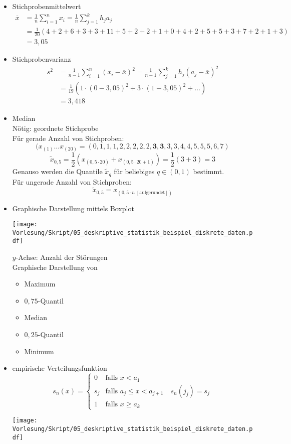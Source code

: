 \documentclass{scrreprt}
\begin{document}
\begin{itemize}
\item Stichprobenmittelwert
\begin{align*}
\overline{x} &= \frac{1}{n} \sum_{i=1}^n x_i = \frac{1}{n} \sum_{j=1}^k h_j a_j\\
&= \frac{1}{20}(4+2+6+3+3+11+5+2+2+1+0+4+2+5+5+3+7+2+1+3)\\
&= 3,05
\end{align*}
\item Stichprobenvarianz
\begin{align*}
s^2 &= \frac{1}{n-1}\sum_{i=1}^n (x_i-\overline{x})^2 = \frac{1}{n-1}\sum_{j=1}^k h_j (a_j-\overline{x})^2\\
&= \frac{1}{19} (1 \cdot (0-3,05)^2 + 3 \cdot (1-3,05)^2 + \ldots)\\
&= 3,418
\end{align*}
\item Median\\
Nötig: geordnete Stichprobe\\
Für gerade Anzahl von Stichproben:
$$(x_{(1)}\ldots x_{(20)}=(0,1,1,1,2,2,2,2,2,\textbf{3},\textbf{3},3,3,4,4,5,5,5,6,7)$$
$$\tilde x _{0,5} = \frac{1}{2}(x_{(0,5\cdot 20)} + x_{(0,5\cdot 20 + 1)}) = \frac{1}{2}(3+3) = 3$$
Genauso werden die Quantile $\tilde x_q$ für beliebiges $q \in (0,1)$ bestimmt.\\
Für ungerade Anzahl von Stichproben: 
$$\tilde x_{0,5}=x_{(0,5 \cdot n\;[\mathrm{aufgerundet}])}$$
\item Graphische Darstellung mittels Boxplot
\begin{center}
\texttt{[image: Vorlesung/Skript/05\_deskriptive\_statistik\_beispiel\_diskrete\_daten.pdf]}
\end{center}
$y$-Achse: Anzahl der Störungen\\
Graphische Darstellung von 
\begin{itemize}
\item Maximum
\item $0,75$-Quantil
\item Median
\item $0,25$-Quantil
\item Minimum
\end{itemize}
\item empirische Verteilungsfunktion
$$s_n(x) = \begin{cases}
0 & \text{falls }x < a_1\\
s_j & \text{falls }a_j \leq x < a_{j+1} \quad s_n(j_j) = s_j\\
1 & \text{falls }x\geq a_k
\end{cases}$$
\begin{center}
\texttt{[image: Vorlesung/Skript/05\_deskriptive\_statistik\_beispiel\_diskrete\_daten.pdf]}
\end{center}
\end{itemize}
\end{document}
